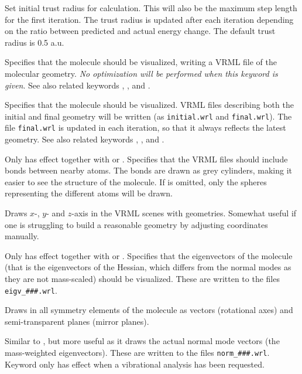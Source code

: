 \begin{description}
Set initial trust radius for calculation. This
will also be the
maximum step length for the first iteration. The trust radius is
updated after each iteration depending on the ratio between predicted
and actual energy change. The default trust radius is 0.5 a.u.

\item[\Key{VISUAL}]
Specifies that the molecule should be
visualized,
writing a VRML file of the molecular geometry. {\em{No optimization
will be performed when this keyword is given}}. See also related
keywords , ,  and .

\item[\Key{VRML}]
Specifies that the molecule should be
visualized. VRML files describing
both the initial and final geometry
will be written (as \verb|initial.wrl| and \verb|final.wrl|). The file
\verb|final.wrl| is  updated in each iteration, so that it always
reflects the latest geometry. See also related keywords ,
,  and .

\item[\Key{VR-BON}]
Only has effect together with  or . Specifies
that the VRML files should include bonds between nearby
atoms. The
bonds are drawn as grey cylinders, making it easier to see the
structure of the molecule. If  is omitted, only the
spheres representing the different atoms will be drawn.

\item[\Key{VR-COR}]
Draws $x$-, $y$- and $z$-axis in the VRML scenes with
geometries. Somewhat useful if one is struggling to build a reasonable
geometry by adjusting coordinates manually.

\item[\Key{VR-EIG}]
Only has effect together with  or
.
Specifies that the eigenvectors of the molecule (that is the
eigenvectors of the Hessian, which differs from the normal modes as
they are not mass-scaled) should be visualized. These are written to
the files \verb|eigv_###.wrl|.

\item[\Key{VR-SYM}]
Draws in all symmetry elements of the molecule as vectors (rotational
axes) and semi-transparent planes (mirror planes).

\item[\Key{VR-VIB}]
Similar to , but more useful as it draws the actual normal
mode vectors (the mass-weighted eigenvectors). These are written to
the files \verb|norm_###.wrl|. Keyword only has effect when a
vibrational analysis has been requested.

\end{description}


